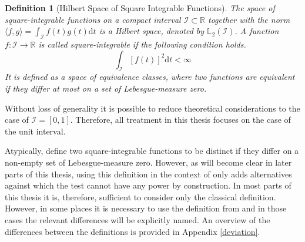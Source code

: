 \documentclass[12pt, a4paper]{article}
\theoremstyle{MAstyle} \newtheorem{assumption}{Assumption}[section]
\theoremstyle{MAstyle} \newtheorem{definition}{Definition}[section]
\theoremstyle{MAstyle} \newtheorem{theorem}{Theorem}[section]
\begin{document}
			\begin{definition}[Hilbert Space of Square Integrable Functions]
				The space of square-integrable functions on a compact interval $\mathcal{I} \subset \mathbb{R}$ together with the norm $\langle f,g\rangle = \int_{\mathcal{I}} f(t)g(t) \mathrm{d}t$ is a Hilbert space, denoted by $\mathbb{L}_2(\mathcal{I})$.
				A function $f: \mathcal{I} \rightarrow \mathbb{R}$ is called square-integrable if the following condition holds.
				\begin{equation}
					\int_{\mathcal{I}} \left[f(t)\right]^2\mathrm{d}t < \infty
				\end{equation}
			It is defined as a space of equivalence classes, where two functions are equivalent if they differ at most on a set of Lebesgue-measure zero. 
			\end{definition}
			Without loss of generality it is possible to reduce theoretical considerations to the case of $\mathcal{I} = [0,1]$. Therefore, all treatment in this thesis focuses on the case of the unit interval.
			
		 Atypically, \cite{bugni_permutation_2021} define two square-integrable functions to be distinct if they differ on a non-empty set of Lebesgue-measure zero. However, as will become clear in later parts of this thesis, using this definition in the context of \cite{bugni_permutation_2021} only adds alternatives against which the test cannot have any power by construction. 
		 In most parts of this thesis it is, therefore, sufficient to consider only the classical definition. However, in some places it is necessary to use the definition from \cite{bugni_permutation_2021} and in those cases the relevant differences will be explicitly named.
		 An overview of the differences between the definitions is provided in Appendix \ref{deviation}.
\end{document}
